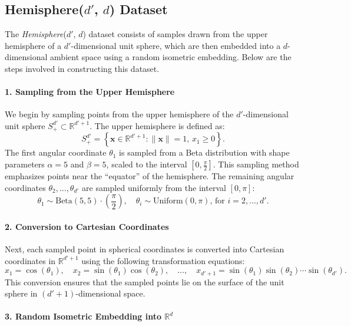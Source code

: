 \subsection{Hemisphere($d'$, $d$) Dataset}

The \textit{Hemisphere}($d'$, $d$) dataset consists of samples drawn from the upper hemisphere of a $d'$-dimensional unit sphere, which are then embedded into a $d$-dimensional ambient space using a random isometric embedding. Below are the steps involved in constructing this dataset.

\paragraph{1. Sampling from the Upper Hemisphere}

We begin by sampling points from the upper hemisphere of the $d'$-dimensional unit sphere $S^{d'}_+ \subset \mathbb{R}^{d'+1}$. The upper hemisphere is defined as:
\[
S^{d'}_+ = \left\{ \mathbf{x} \in \mathbb{R}^{d'+1} : \|\mathbf{x}\| = 1, \, x_1 \geq 0 \right\}.
\]
The first angular coordinate $\theta_1$ is sampled from a Beta distribution with shape parameters $\alpha = 5$ and $\beta = 5$, scaled to the interval $\left[ 0, \frac{\pi}{2} \right]$. This sampling method emphasizes points near the ``equator'' of the hemisphere. The remaining angular coordinates $\theta_2, \ldots, \theta_{d'}$ are sampled uniformly from the interval $\left[ 0, \pi \right]$:
\[
\theta_1 \sim \text{Beta}(5, 5) \cdot \left( \frac{\pi}{2} \right), \quad \theta_i \sim \text{Uniform}(0, \pi), \, \text{for } i = 2, \ldots, d'.
\]

\paragraph{2. Conversion to Cartesian Coordinates}

Next, each sampled point in spherical coordinates is converted into Cartesian coordinates in $\mathbb{R}^{d'+1}$ using the following transformation equations:
\[
x_1 = \cos(\theta_1), \quad x_2 = \sin(\theta_1) \cos(\theta_2), \quad \dots, \quad x_{d'+1} = \sin(\theta_1) \sin(\theta_2) \cdots \sin(\theta_{d'}).
\]
This conversion ensures that the sampled points lie on the surface of the unit sphere in $(d'+1)$-dimensional space.

\paragraph{3. Random Isometric Embedding into $\mathbb{R}^d$}

